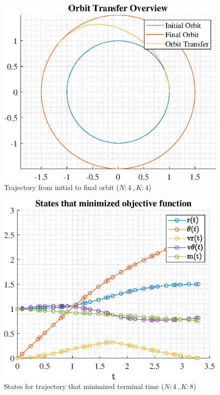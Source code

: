 \documentclass[]{article}
\begin{document}
\begin{figure}
	\centering
	\includegraphics[scale=0.75]{orbit_N4_K4_C2_tf.eps}
	\caption{Trajectory from initial to final orbit (\(N:4\ , K:4\))}
	\label{fig:orbit_N4_K4_C2_tf}
\end{figure}
\begin{figure}
	\centering
	\includegraphics[scale=0.75]{states_N4_K8_C2_tf.eps}
	\caption{States for trajectory that minimized terminal time (\(N:4\ , K:8\))}
	\label{fig:states_N4_K8_C2_tf}
\end{figure}
\end{document}
